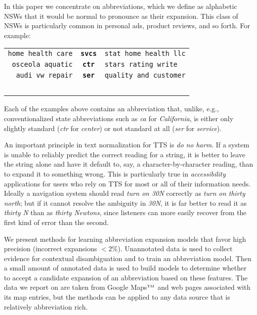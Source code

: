 \documentclass[11pt]{article}
\begin{document}
In this paper we concentrate on abbreviations, which we define as alphabetic
NSWs that it would be normal to pronounce as their expansion.  This class of
NSWs is particularly common in personal ads, product reviews, and so forth. For
example:\\\vspace*{-0.075in}

\begin{small}
\noindent 
\hspace*{-0.12in}\begin{tabular}{r@{~}c@{~}l}
{\tt home health care} & {\tt \textbf{svcs}} & {\tt stat home health llc}\\
{\tt osceola aquatic} & {\tt \textbf{ctr}} & {\tt stars rating write}\\
{\tt audi vw repair} & {\tt \textbf{ser}} & {\tt quality and customer}\\~\vspace*{-0.125in}
\end{tabular}
\end{small}

\noindent Each of the examples above contains an abbreviation that, unlike,
e.g., conventionalized state abbreviations such as \emph{ca} for
\emph{California}, is either only slightly standard (\emph{ctr} for
  \emph{center}) or not standard at all (\emph{ser} for \emph{service}).

An important principle in text normalization for TTS is \emph{do no harm}. If a
system is unable to reliably predict the correct reading for a string, it is
better to leave the string alone and have it default to, say, a
character-by-character reading, than to expand it to something wrong. This is
particularly true in \emph{accessibility} applications for users who rely on TTS
for most or all of their information needs. Ideally a
navigation system should read \emph{turn on 30N} correctly as \emph{turn on
  thirty north}; but if it cannot resolve the ambiguity in \emph{30N}, it
is far better to read it as \emph{thirty N} than as \emph{thirty Newtons},
since listeners can more easily recover from the first kind of error than
the second.

We present methods for learning abbreviation expansion models that favor high
precision (incorrect expansions $<2\%$).  Unannotated data is used to collect
evidence for contextual disambiguation and to train an abbreviation model.  Then
a small amount of annotated data is used to build models to determine whether to
accept a candidate expansion of an abbreviation based on these features.  The
data we report on are taken from Google Maps$^{\mbox{\tiny TM}}$ and web pages associated with
its map entries, but the methods can be applied to any data source that is
relatively abbreviation rich. 
\end{document}
